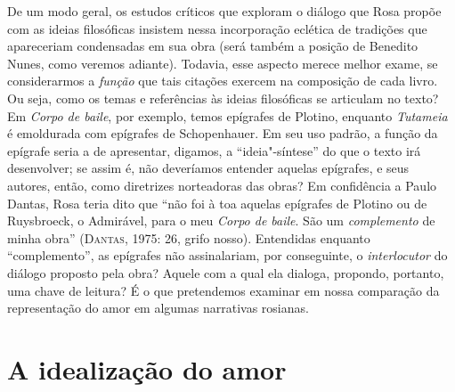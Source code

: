 {De um modo geral, os estudos críticos que exploram o diálogo que Rosa
propõe com as ideias filosóficas insistem nessa incorporação eclética
de tradições que apareceriam condensadas em sua obra (será também a
posição de Benedito Nunes, como veremos adiante). Todavia, esse
aspecto merece melhor exame, se considerarmos a \emph{função} que
tais citações exercem na composição de cada livro. Ou seja, como os
temas e referências às ideias filosóficas se articulam no texto? Em
\emph{Corpo de baile}, por exemplo, temos epígrafes de Plotino,
enquanto \emph{Tutameia} é emoldurada com epígrafes de
Schopenhauer. Em seu uso padrão, a função da epígrafe seria a de
apresentar, digamos, a “ideia"-síntese” do que o texto irá
desenvolver; se assim é, não deveríamos entender aquelas epígrafes, e
seus autores, então, como diretrizes norteadoras das obras? Em
confidência a Paulo Dantas, Rosa teria dito que “não foi à toa
aquelas epígrafes de Plotino ou de Ruysbroeck, o Admirável, para o
meu \emph{Corpo de baile}. São um \emph{complemento} de minha
obra” (\textsc{Dantas}, 1975: 26, grifo nosso). Entendidas enquanto
“complemento”, as epígrafes não assinalariam, por conseguinte, o
\emph{interlocutor} do diálogo proposto pela obra? Aquele com a
qual ela dialoga, propondo, portanto, uma chave de leitura? É o que
pretendemos examinar em nossa comparação da representação do amor em
algumas narrativas rosianas.

\section{A idealização do amor}

}
